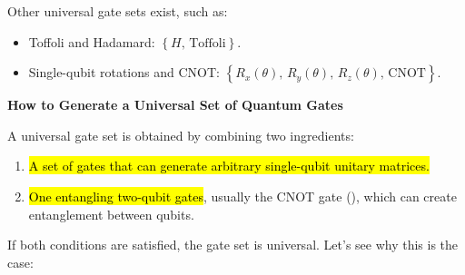 \highspace
Other universal gate sets exist, such as:
\begin{itemize}
    \item Toffoli and Hadamard: $\left\{H, \, \text{Toffoli}\right\}$.
    \item Single-qubit rotations and CNOT: $\left\{R_x(\theta), \, R_y(\theta), \, R_z(\theta), \, \text{CNOT}\right\}$.
\end{itemize}

\highspace
\begin{flushleft}
    \textcolor{Green3}{ \textbf{How to Generate a Universal Set of Quantum Gates}}
\end{flushleft}
A universal gate set is obtained by combining two ingredients:
\begin{enumerate}
    \item \hl{A set of gates that can generate arbitrary single-qubit unitary matrices.}
    \item \hl{One entangling two-qubit gates}, usually the CNOT gate (), which can create entanglement between qubits.
\end{enumerate}
If both conditions are satisfied, the gate set is universal. Let's see why this is the case:
